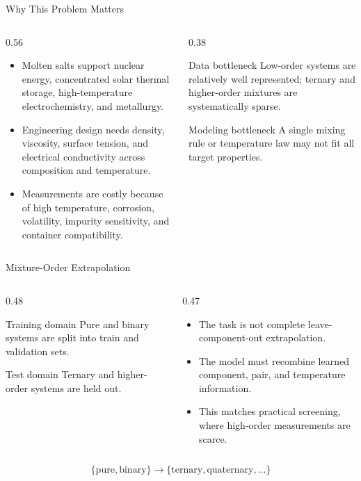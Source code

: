 \documentclass[aspectratio=169,10pt]{beamer}
\begin{document}
\begin{frame}{Why This Problem Matters}
  \begin{columns}[T,onlytextwidth]
    \begin{column}{0.56\textwidth}
      \begin{itemize}
        \item Molten salts support nuclear energy, concentrated solar thermal storage, high-temperature electrochemistry, and metallurgy.
        \item Engineering design needs density, viscosity, surface tension, and electrical conductivity across composition and temperature.
        \item Measurements are costly because of high temperature, corrosion, volatility, impurity sensitivity, and container compatibility.
      \end{itemize}
    \end{column}
    \begin{column}{0.38\textwidth}
      \begin{block}{Data bottleneck}
        Low-order systems are relatively well represented; ternary and higher-order mixtures are systematically sparse.
      \end{block}
      \begin{block}{Modeling bottleneck}
        A single mixing rule or temperature law may not fit all target properties.
      \end{block}
    \end{column}
  \end{columns}
\end{frame}

\begin{frame}{Mixture-Order Extrapolation}
  \begin{columns}[T,onlytextwidth]
    \begin{column}{0.48\textwidth}
      \begin{block}{Training domain}
        Pure and binary systems are split into train and validation sets.
      \end{block}
      \begin{block}{Test domain}
        Ternary and higher-order systems are held out.
      \end{block}
    \end{column}
    \begin{column}{0.47\textwidth}
      \begin{itemize}
        \item The task is not complete leave-component-out extrapolation.
        \item The model must recombine learned component, pair, and temperature information.
        \item This matches practical screening, where high-order measurements are scarce.
      \end{itemize}
    \end{column}
  \end{columns}
  \vfill
  \[
    \{\mathrm{pure},\mathrm{binary}\}\longrightarrow
    \{\mathrm{ternary},\mathrm{quaternary},\ldots\}
  \]
\end{frame}
\end{document}
